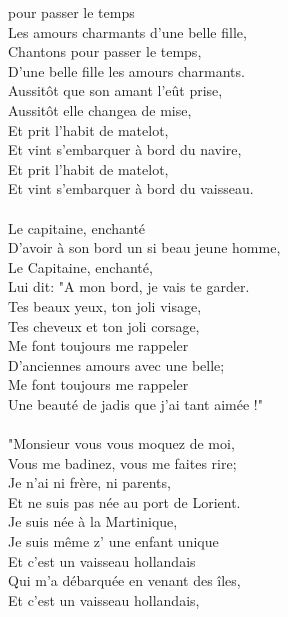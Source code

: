 \vspace{-0.3cm}
 pour passer le temps
\\Les amours charmants d'une belle fille,
\\Chantons pour passer le temps,
\\D'une belle fille les amours charmants.
\\Aussitôt que son amant l'eût prise,
\\Aussitôt elle changea de mise,
\\Et prit l'habit de matelot,
\\Et vint s'embarquer à bord du navire,
\\Et prit l'habit de matelot,
\\Et vint s'embarquer à bord du vaisseau.
\\\\Le capitaine, enchanté
\\D'avoir à son bord un si beau jeune homme,
\\Le Capitaine, enchanté,
\\Lui dit: "A mon bord, je vais te garder.
\\Tes beaux yeux, ton joli visage,
\\Tes cheveux et ton joli corsage,
\\Me font toujours me rappeler
\\D'anciennes amours avec une belle;
\\Me font toujours me rappeler
\\Une beauté de jadis que j'ai tant aimée !"
\\\\"Monsieur vous vous moquez de moi,
\\Vous me badinez, vous me faites rire;
\\Je n'ai ni frère, ni parents,
\\Et ne suis pas née au port de Lorient.
\\Je suis née à la Martinique,
\\Je suis même z' une enfant unique
\\Et c'est un vaisseau hollandais
\\Qui m'a débarquée en venant des îles,
\\Et c'est un vaisseau hollandais,
